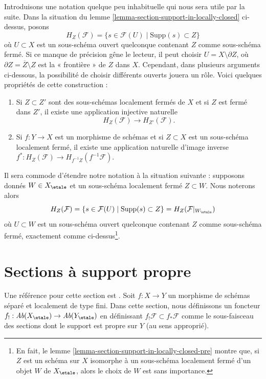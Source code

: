 \noindent
Introduisons une notation quelque peu inhabituelle qui nous sera
utile par la suite. Dans la situation du
lemme \ref{lemma-section-support-in-locally-closed} ci-dessus, posons
$$
H_Z(\mathcal{F}) = \{s \in \mathcal{F}(U) \mid \text{Supp}(s) \subset Z\}
$$
où $U \subset X$ est un sous-schéma ouvert quelconque contenant $Z$ comme
sous-schéma fermé. Si ce manque de précision gêne le lecteur, il peut
choisir $U = X \setminus \partial Z$, où
$\partial Z = \overline{Z}\setminus Z$ est la « frontière » de $Z$ dans $X$.
Cependant, dans plusieurs arguments ci-dessous, la possibilité de choisir
différents ouverts jouera un rôle. Voici quelques propriétés de cette
construction :
\begin{enumerate}
\item
\label{item-inclusion}
Si $Z \subset Z'$ sont des sous-schémas localement fermés de $X$ et si $Z$ est
fermé dans $Z'$, il existe une application injective naturelle
$$
H_Z(\mathcal{F}) \to H_{Z'}(\mathcal{F}).
$$
\item
\label{item-pullback}
Si $f : Y \to X$ est un morphisme de schémas et si $Z \subset X$ est un
sous-schéma localement fermé, il existe une application naturelle
d'image inverse $f^* : H_Z(\mathcal{F}) \to H_{f^{-1}Z}(f^{-1}\mathcal{F})$.
\end{enumerate}
Il sera commode d'étendre notre notation à la situation suivante :
supposons donnés $W \in X_\etale$ et un sous-schéma localement fermé
$Z \subset W$. Nous noterons alors
$$
H_Z(\mathcal{F}) =
\{s \in \mathcal{F}(U) \mid \text{Supp}(s) \subset Z\} =
H_Z(\mathcal{F}|_{W_\etale})
$$
où $U \subset W$ est un sous-schéma ouvert quelconque contenant $Z$
comme sous-schéma fermé, exactement comme ci-dessus\footnote{En fait, le
lemme \ref{lemma-section-support-in-locally-closed-pre}
montre que, si $Z$ est un schéma sur $X$ isomorphe à un sous-schéma
localement fermé d'un objet $W$ de $X_\etale$, alors
le choix de $W$ est sans importance.}.







\section{Sections à support propre}
\label{section-compact-support}

\noindent
Une référence pour cette section est \cite[Exposé XVII, section 6]{SGA4}.
Soit $f : X \to Y$ un morphisme de schémas séparé et
localement de type fini. Dans cette section, nous définissons un foncteur
$f_! : \textit{Ab}(X_\etale) \to \textit{Ab}(Y_\etale)$
en définissant $f_!\mathcal{F} \subset f_*\mathcal{F}$ comme
le sous-faisceau des sections dont le support est propre sur $Y$
(au sens approprié).

